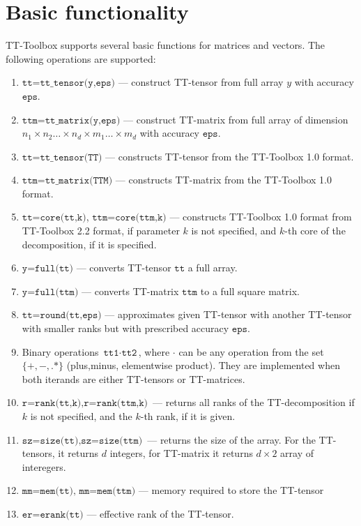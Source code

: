 \documentclass[a4paper,12pt,twoside]{article}
\begin{document}
\section{Basic functionality}
TT-Toolbox supports several basic functions for matrices and vectors.
The following operations are supported:
\begin{enumerate}
\item $\texttt{tt=tt\_tensor(y,eps)}$ --- construct TT-tensor from full array $y$ with accuracy $\texttt{eps}$. 
\item $\texttt{ttm=tt\_matrix(y,eps)}$ --- construct TT-matrix from full array of dimension $n_1 \times n_2 \ldots \times n_d \times m_1 \ldots \times m_d$
with accuracy $\texttt{eps}$. 
\item $\texttt{tt=tt\_tensor(TT)}$ --- constructs TT-tensor from the TT-Toolbox 1.0 format.
\item $\texttt{ttm=tt\_matrix(TTM)}$ --- constructs TT-matrix from the TT-Toolbox 1.0 format.
\item $\texttt{tt=core(tt,k)}$, $\texttt{ttm=core(ttm,k)}$ --- constructs TT-Toolbox 1.0 format from TT-Toolbox 2.2 format, if parameter
$k$ is not specified, and $k$-th core of the decomposition, if it is specified.
\item $\texttt{y=full(tt)}$ --- converts TT-tensor $\texttt{tt}$ a full array.
\item $\texttt{y=full(ttm)}$ --- converts TT-matrix $\texttt{ttm}$ to a full square matrix. 
\item $\texttt{tt=round(tt,eps)}$ --- approximates given TT-tensor with another TT-tensor with smaller ranks but with prescribed accuracy $\texttt{eps}$.
\item Binary operations $\texttt{tt1} \cdot \texttt{tt2}$, where $\cdot$ can be any operation from the set $\{+,-,.*\}$ (plus,minus, elementwise
product). They are implemented when 
both iterands are either TT-tensors or TT-matrices.
\item $\texttt{r=rank(tt,k)}, \texttt{r=rank(ttm,k)}$ --- returns all ranks of the TT-decomposition if $k$ is not specified,
and the $k$-th rank, if it is given.
\item $\texttt{sz=size(tt)}, \texttt{sz=size(ttm)}$ --- returns the size of the array. For the TT-tensors, it returns $d$ integers,
for TT-matrix it returns $d \times 2$ array of interegers. 
\item $\texttt{mm=mem(tt), mm=mem(ttm)}$ --- memory required to store the TT-tensor 
\item $\texttt{er=erank(tt)}$ --- effective rank of the TT-tensor.

\end{enumerate}
\end{document}
